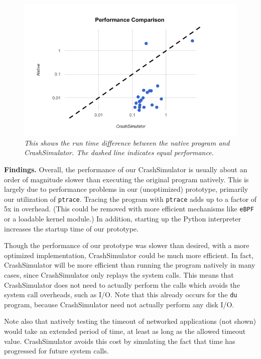     \begin{figure}[t]
        \center{}
        \includegraphics[scale=.5]{performance.png}
        \caption{\emph{This shows the run time difference between the
native program and CrashSimulator. The dashed line indicates equal
performance. }}

    \end{figure}


{\bf Findings.}
Overall, the performance of our CrashSimulator is usually about an order of
magnitude slower than executing the original program natively.  This is 
largely due to performance problems in our (unoptimized) prototype, 
primarily our utilization of {\tt ptrace}.  Tracing the program
with {\tt ptrace} adds up to a factor of 5x in overhead.  (This could
be removed with more efficient mechanisms like {\tt eBPF} or a loadable 
kernel module.)  In addition, starting up the Python interpreter increases the
startup time of our prototype.

Though the performance of our prototype was slower than desired,
with a more optimized implementation, CrashSimulator could be much more 
efficient.
In fact, CrashSimulator will be more efficient than 
running the program natively in many cases, since CrashSimulator only
replays the system calls. This means that CrashSimulator does not need to
actually perform the calls which avoids the system call overheads, such as 
I/O.  Note that this already occurs for the {\tt du} program, because 
CrashSimulator need not actually perform any disk I/O.

Note also that natively testing the timeout of networked applications (not
shown) would take an extended period of time, at least as long as the allowed
timeout value.  CrashSimulator avoids this cost by simulating the fact that
time has progressed for future system calls.
